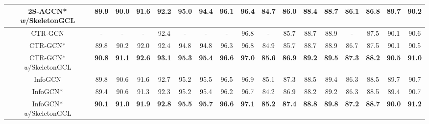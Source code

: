 \documentclass{article} \usepackage{iclr2023_conference,times}
\begin{document}
\begin{table}[t]
\begin{tabular}{c||c|c|c|c|c|c|c|c||c|c|c|c|c|c|c|c}
       2S-AGCN* \textit{w}/SkeletonGCL & \textbf{89.9} & \textbf{90.0} & \textbf{91.6} & \textbf{92.2} & \textbf{95.0} & \textbf{94.4} & \textbf{96.1} & \textbf{96.4} & \textbf{84.7} & \textbf{86.0} & \textbf{88.4} & \textbf{88.7} & \textbf{86.1} & \textbf{86.8} & \textbf{89.7} & \textbf{90.2} \\
       \hline \hline 
       {\color{gray}CTR-GCN \citep{CTRGCN}} & - & - & - & {\color{gray}92.4} & - & - & - & {\color{gray}96.8} & - & {\color{gray}85.7} & {\color{gray}88.7} & {\color{gray}88.9} & - & {\color{gray}87.5} & {\color{gray}90.1} & {\color{gray}90.6} \\
       CTR-GCN* \citep{CTRGCN} & 89.8 & 90.2 & 92.0 & 92.4 & 94.8 & 94.8 & 96.3 & 96.8 & 84.9 & 85.7 & 88.7 & 88.9 & 86.7 & 87.5 & 90.1 & 90.5 \\
       CTR-GCN* \textit{w}/SkeletonGCL & \textbf{90.8} & \textbf{91.1} & \textbf{92.6} & \textbf{93.1} & \textbf{95.3} & \textbf{95.4} & \textbf{96.6} & \textbf{97.0} & \textbf{85.6} & \textbf{86.9} & \textbf{89.2} & \textbf{89.5} & \textbf{87.3} & \textbf{88.2} & \textbf{90.5} & \textbf{91.0} \\
       \hline \hline
       {\color{gray} InfoGCN \citep{INFOGCN}} & {\color{gray}89.8} & {\color{gray}90.6} & {\color{gray}91.6} & {\color{gray}92.7} & {\color{gray}95.2} & {\color{gray}95.5} & {\color{gray}96.5} & {\color{gray}96.9} & {\color{gray}85.1} & {\color{gray}87.3} & {\color{gray}88.5} & {\color{gray}89.4} & {\color{gray}86.3} & {\color{gray}88.5} & {\color{gray}89.7} & {\color{gray}90.7} \\
       InfoGCN* \citep{INFOGCN} & 89.4 & 90.6 & 91.3 & 92.3 & 95.2 & 95.4 & 96.2 & 96.7 & 84.2 & 86.9 & 88.2 & 89.2 & 86.3 & 88.5 & 89.4 & 90.7 \\
       InfoGCN* \textit{w}/SkeletonGCL & \textbf{90.1} & \textbf{91.0} & \textbf{91.9} & \textbf{92.8} & \textbf{95.5} & \textbf{95.7} & \textbf{96.6} & \textbf{97.1} & \textbf{85.2} & \textbf{87.4} & \textbf{88.8} & \textbf{89.8} & \textbf{87.2} & \textbf{88.7} & \textbf{90.0} & \textbf{91.2} \\
       \hline
    \end{tabular}
    \label{tab:state-of-the-art ntu}
\end{table}
\end{document}
